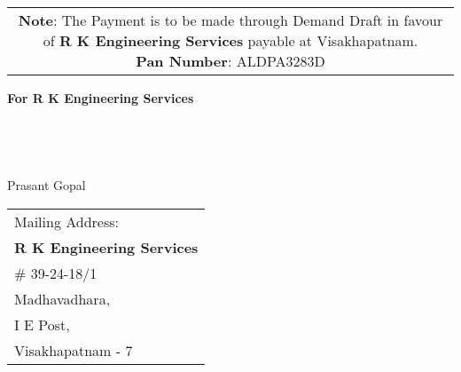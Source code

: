 \documentclass[11pt]{article}
\begin{document}
\vspace*{-1 cm}
\begin{tabular}{c}
\parbox{4in}{ {\bf Note}: The Payment is to be made through Demand Draft in favour of {\bf R K Engineering Services} payable at Visakhapatnam. \\
{\noindent \bf Pan Number}:  ALDPA3283D }\\
\end{tabular}
\vspace*{65pt}


{\bf For  R K Engineering Services } \\ \\ \\ \\ \\
 \hspace*{0.6cm}Prasant Gopal
\vspace*{-70pt}
\begin{flushright}
\begin{tabular}{l}
Mailing Address:\\
{\bf R K Engineering Services}\\
\# 39-24-18/1\\
Madhavadhara, \\ 
I E Post, \\
Visakhapatnam - 7\\
\end{tabular}
\end{flushright}
\end{document}
